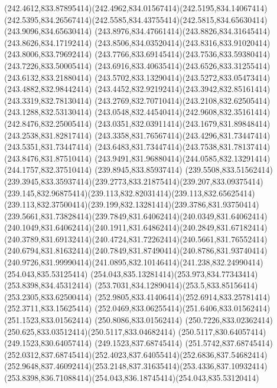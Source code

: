 {{	\curveto(242.4612,833.87895414)(242.4962,834.01567414)(242.5195,834.14067414)
	\curveto(242.5395,834.26567414)(242.5585,834.43755414)(242.5815,834.65630414)
	\lineto(243.9096,834.65630414)
	\curveto(243.8976,834.47661414)(243.8826,834.31645414)(243.8626,834.17192414)
	\curveto(243.8506,834.03520414)(243.8316,833.91020414)(243.8006,833.79692414)
	\curveto(243.7766,833.69145414)(243.7536,833.59380414)(243.7226,833.50005414)
	\curveto(243.6916,833.40635414)(243.6526,833.31255414)(243.6132,833.21880414)
	\curveto(243.5702,833.13290414)(243.5272,833.05473414)(243.4882,832.98442414)
	\curveto(243.4452,832.92192414)(243.3942,832.85161414)(243.3319,832.78130414)
	\curveto(243.2769,832.70710414)(243.2108,832.62505414)(243.1288,832.53130414)
	\curveto(243.0548,832.44540414)(242.9608,832.35161414)(242.8476,832.25005414)
	\curveto(243.0351,832.03911414)(243.1679,831.89848414)(243.2538,831.82817414)
	\curveto(243.3358,831.76567414)(243.4296,831.73447414)(243.5351,831.73447414)
	\curveto(243.6483,831.73447414)(243.7538,831.78137414)(243.8476,831.87510414)
	\curveto(243.9491,831.96880414)(244.0585,832.13291414)(244.1757,832.37510414)
	\closepath
	\moveto(239.8945,833.85937414)
	\lineto(239.5508,833.51562414)
	\curveto(239.3945,833.35937414)(239.2773,833.21875414)(239.207,833.09375414)
	\curveto(239.145,832.96875414)(239.113,832.82031414)(239.113,832.65625414)
	\curveto(239.113,832.37500414)(239.199,832.13281414)(239.3786,831.93750414)
	\curveto(239.5661,831.73828414)(239.7849,831.64062414)(240.0349,831.64062414)
	\curveto(240.1049,831.64062414)(240.1911,831.64862414)(240.2849,831.67182414)
	\curveto(240.3789,831.69132414)(240.4724,831.72262414)(240.5661,831.76552414)
	\curveto(240.6794,831.81632414)(240.7849,831.87490414)(240.8786,831.93740414)
	\curveto(240.9726,831.99990414)(241.0895,832.10146414)(241.238,832.24990414)
	\closepath
	\moveto(254.043,835.53125414)
	\curveto(254.043,835.13281414)(253.973,834.77343414)(253.8398,834.45312414)
	\curveto(253.7031,834.12890414)(253.5,833.85156414)(253.2305,833.62500414)
	\curveto(252.9805,833.41406414)(252.6914,833.25781414)(252.3711,833.15625414)
	\curveto(252.0469,833.06255414)(251.6406,833.01562414)(251.1523,833.01562414)
	\lineto(250.8086,833.01562414)
	\curveto(250.7226,833.02362414)(250.625,833.03512414)(250.5117,833.04682414)
	\lineto(250.5117,830.64057414)
	\lineto(249.1523,830.64057414)
	\lineto(249.1523,837.68745414)
	\lineto(251.5742,837.68745414)
	\curveto(252.0312,837.68745414)(252.4023,837.64055414)(252.6836,837.54682414)
	\curveto(252.9648,837.46092414)(253.2148,837.31635414)(253.4336,837.10932414)
	\curveto(253.8398,836.71088414)(254.043,836.18745414)(254.043,835.53120414)
}}
